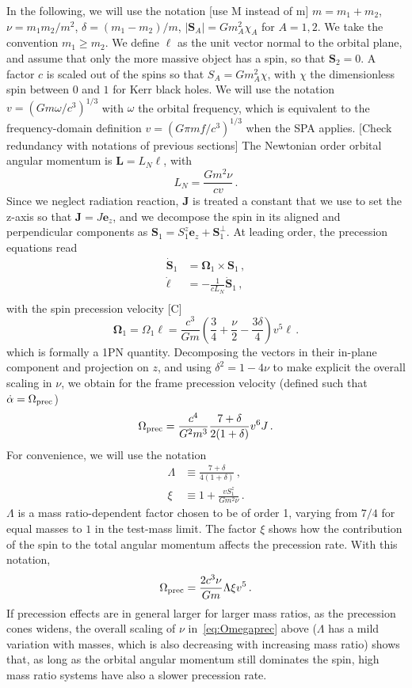 \documentclass[aps,showpacs,twocolumn,
prd,superscriptaddress,nofootinbib]{revtex4-1}
\newcommand{\be}{\begin{equation}}
\newcommand{\ee}{\end{equation}}
\newcommand{\nn}{\nonumber}
\newcommand{\SM}[1]{{\color{Red} #1}}
\begin{document}
In the following, we will use the notation \SM{[use M instead of m]} $m=m_{1}+m_{2}$, $\nu=m_{1}m_{2}/m^{2}$, $\delta = (m_{1}-m_{2})/m$, $|\bm{S}_{A}|=Gm_{A}^{2} \chi_{A}$ for $A=1,2$. We take the convention $m_{1} \geq m_{2}$. We define $\bm{\ell}$ as the unit vector normal to the orbital plane, and assume that only the more massive object has a spin, so that $\bm{S}_{2} = 0$. A factor $c$ is scaled out of the spins so that $S_{A} = G m_{A}^{2} \chi$, with $\chi$ the dimensionless spin between $0$ and $1$ for Kerr black holes. We will use the notation $v = (G m \omega/c^{3})^{1/3}$ with $\omega$ the orbital frequency, which is equivalent to the frequency-domain definition $v=(G \pi m f/c^{3})^{1/3}$ when the SPA applies. \SM{[Check redundancy with notations of previous sections]} The Newtonian order orbital angular momentum is $\bm{L} = L_{N} \bm{\ell}$, with
\be\label{eq:defLN}
	L_{N} = \frac{G m^{2} \nu}{c v} \,.
\ee
Since we neglect radiation reaction, $\bm{J}$ is treated a constant that we use to set the z-axis so that $\bm{J} = J \bm{e}_{z}$, and we decompose the spin in its aligned and perpendicular components as $\bm{S}_{1} = S_{1}^{z} \bm{e}_{z} + \bm{S}_{1}^{\perp}$. At leading order, the precession equations read
\begin{align}
	\dot{\bm{S}}_{1} &= \bm{\Omega}_{1} \times \bm{S}_{1} \,, \nn\\
	\dot{\bm{\ell}} &= - \frac{1}{c L_{N}}  \dot{\bm{S}}_{1}\,, \nn\\
\end{align}
with the spin precession velocity \cite{} \SM{[C]}
\be
	\bm{\Omega}_{1} = \Omega_{1} \bm{\ell} = \frac{c^{3}}{G m} \left( \frac{3}{4} + \frac{\nu}{2} - \frac{3\delta}{4} \right) v^{5} \bm{\ell} \,.
\ee
which is formally a 1PN quantity. Decomposing the vectors in their in-plane component and projection on $z$, and using $\delta^{2} = 1-4\nu$ to make explicit the overall scaling in $\nu$, we obtain for the frame precession velocity (defined such that $\dot{\alpha} = \Omega_{\rm prec}$)
\be
	\Omega_{\rm prec} = \frac{c^{4}}{G^{2} m^{3}} \frac{7+\delta}{2(1+\delta)} v^{6} J\,.
\ee
For convenience, we will use the notation
\begin{subequations}
\begin{align}
	\Lambda &\equiv \frac{7+\delta}{4(1+\delta)} \,, \\
	\xi &\equiv 1 + \frac{v S_{1}^{z}}{G m^{2} \nu} \,.
\end{align}
\end{subequations}
$\Lambda$ is a mass ratio-dependent factor chosen to be of order 1, varying from $7/4$ for equal masses to $1$ in the test-mass limit. The factor $\xi$ shows how the contribution of the spin to the total angular momentum affects the precession rate. With this notation,
\be\label{eq:Omegaprec}
	\Omega_{\rm prec} = \frac{2c^{3} \nu}{G m} \Lambda \xi v^{5} \,.
\ee
If precession effects are in general larger for larger mass ratios, as the precession cones widens, the overall scaling of $\nu$ in~\eqref{eq:Omegaprec} above ($\Lambda$ has a mild variation with masses, which is also decreasing with increasing mass ratio) shows that, as long as the orbital angular momentum still dominates the spin, high mass ratio systems have also a slower precession rate.
\end{document}
